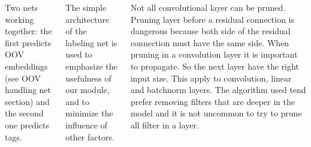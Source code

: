 \documentclass[25pt, a0paper,
               colspace=15mm, subcolspace=0mm,
               blockverticalspace=17mm]{tikzposter} %
\begin{document}
\begin{columns}
{  Two nets working together: the first predicts OOV embeddings (see OOV handling net section) and the second one predicts tags.

  The simple architecture of the labeling net is used to emphasize the usefulness of our module, and to minimize the influence of other factors.

  \vspace{-.5mm}

  }









  {
   Not all convolutional layer can be pruned. Pruning layer before a residual connection is dangerous because both side of the residual connection must have the same side.
  \newline
  When pruning in a convolution layer it is important to propagate. So the next layer have the right input size. This apply to convolution, linear and batchnorm layers.
  \newline
  The algorithm used tend prefer removing filters that are deeper in the model and it is not uncommon to try to prune all filter in a layer.
  \newline
  }







  
  
  
  




\end{columns}
\end{document}
